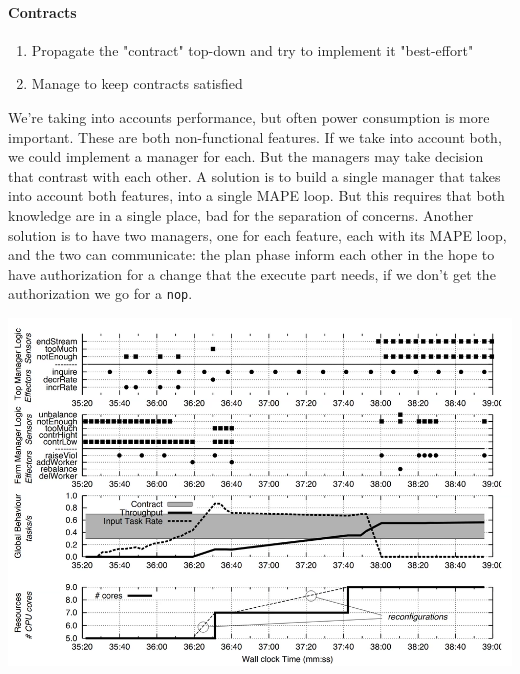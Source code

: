 \documentclass[10pt]{report}
\begin{document}
\paragraph{Contracts}\begin{enumerate}
	\item Propagate the "contract" top-down and try to implement it "best-effort"
	\item Manage to keep contracts satisfied 
\end{enumerate}
We're taking into accounts performance, but often power consumption is more important. These are both non-functional features. If we take into account both, we could implement a manager for each. But the managers may take decision that contrast with each other. A solution is to build a single manager that takes into account both features, into a single MAPE loop. But this requires that both knowledge are in a single place, bad for the separation of concerns. Another solution is to have two managers, one for each feature, each with its MAPE loop, and the two can communicate: the plan phase inform each other in the hope to have authorization for a change that the execute part needs, if we don't get the authorization we go for a \texttt{nop}.
\begin{center}
	\includegraphics[scale=0.5]{15.png}
\end{center}
\end{document}

